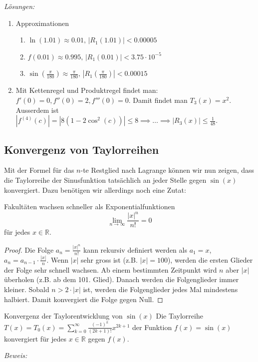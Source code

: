 \clearpage
\emph{Lösungen:}
\begin{enumerate}
	\item  Approximationen
	      \begin{enumerate}
		      \item \( \ln(1.01) \approx 0.01, \,  |R_1(1.01)| < 0.00005 \)
		      \item \( f(0.01) \approx 0.995, \, |R_1(0.01)| < 3.75 \cdot 10^{-5} \)
		      \item  \( \sin\left(\frac{\pi}{180}\right) \approx \frac{\pi}{180} , \, \left|R_1\left(\frac{\pi}{180}\right)\right| < 0.00015 \)


	      \end{enumerate}

	\item Mit Kettenregel und Produktregel findet man: \( f'(0) = 0, f''(0) = 2, f'''(0) = 0 \).
	      Damit findet man \( T_3(x) = x^2 \).
	      Ausserdem ist \( |f^{(4)}(c)| = |8(1-2 \cos^2(c))| \leq 8 \implies \dots \implies |R_3(x)| \leq \frac{1}{48} \).


\end{enumerate}
\clearpage

\subsection{Konvergenz von Taylorreihen}

Mit der Formel für das $n$-te Restglied nach Lagrange können wir nun zeigen, dass die Taylorreihe der Sinusfunktion tatsächlich an jeder Stelle gegen $\sin(x)$ konvergiert. Dazu benötigen wir allerdings noch eine Zutat:
\begin{satz}
	{Fakultäten wachsen schneller als Exponentialfunktionen}{}
	\[\lim_{{n \to \infty}} \frac{|x|^n}{n!} = 0\] für jedes \(x \in \mathbb{R}\).

\end{satz}
\begin{proof}
	Die Folge \(a_n = \frac{|x|^n}{n!}\) kann rekursiv definiert werden als \(a_1 = x\), \(a_n = a_{n-1} \cdot \frac{|x|}{n}\). Wenn \(|x|\) sehr gross ist (z.B. \(|x| = 100\)), werden die ersten Glieder der Folge sehr schnell wachsen. Ab einem bestimmten Zeitpunkt wird \(n\) aber \(|x|\) überholen (z.B. ab dem 101. Glied). Danach werden die Folgenglieder immer kleiner. Sobald \(n > 2 \cdot |x|\) ist, werden die Folgenglieder jedes Mal mindestens halbiert. Damit konvergiert die Folge gegen Null.

\end{proof}
\begin{satz}
	{Konvergenz der Taylorentwicklung von $\sin(x)$}{}
	Die Taylorreihe \(T(x) = T_0(x) = \sum_{k=0}^{\infty} \frac{(-1)^k}{(2k+1)!} x^{2k+1}\) der Funktion \(f(x) = \sin(x)\) konvergiert für jedes \(x \in \mathbb{R}\) gegen \(f(x)\).

\end{satz}
\textit{Beweis:}

